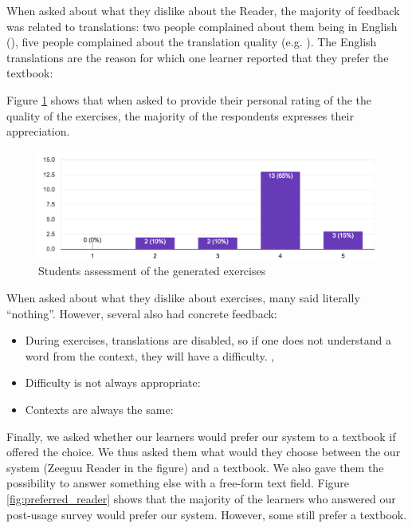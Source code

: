 When asked about what they dislike about the Reader, the majority of feedback was related to translations: two people complained about them being in English (), five people complained about the translation quality (e.g. ). The English translations are the reason for which one learner reported that they prefer the textbook: 

Figure \ref{fig:ex_rating} shows that when asked to provide their personal rating of the the quality of the exercises, the majority of the respondents expresses their appreciation. 

 \begin{figure}[h!]
    \centering
      \includegraphics[width=0.8\columnwidth]{figures/opinions/exercises_rating}
      \caption{Students assessment  of the generated exercises}
      \label{fig:ex_rating}
    \end{figure}

When asked about what they dislike about exercises, many said literally ``nothing''. However, several also had concrete feedback: 
\begin{itemize}
	\item During exercises, translations are disabled, so if one does not understand a word from the context, they will have a difficulty.
		,
	\item Difficulty is not always appropriate: 
	\item Contexts are always the same: 
\end{itemize}

Finally, we asked whether our learners would prefer our system to a textbook if offered the choice. We thus asked them what would they choose between the our system (Zeeguu Reader in the figure) and a textbook. We also gave them the possibility to answer something else with a free-form text field. Figure \ref{fig:preferred_reader} shows that the majority of the learners who answered our post-usage survey would prefer our system. However, some still prefer a textbook. 

